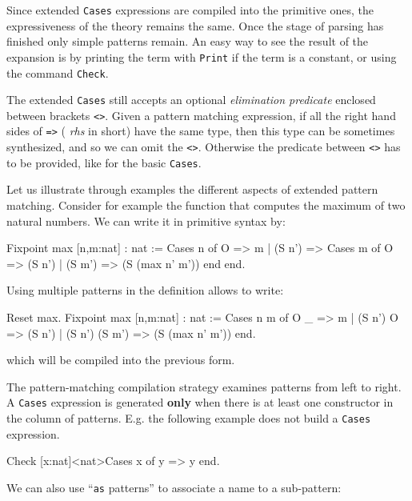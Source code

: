 Since extended {\tt Cases} expressions are compiled into the primitive
ones, the expressiveness of the theory remains the same. Once the
stage of parsing has finished only simple patterns remain. An easy way
to see the result of the expansion is by printing the term with
\texttt{Print} if the term is a constant, or using the command
\texttt{Check}.

The extended \texttt{Cases} still accepts an optional {\em elimination
predicate} enclosed between brackets \texttt{<>}.  Given a pattern
matching expression, if all the right hand sides of \texttt{=>} ({\em
rhs} in short) have the same type, then this type can be sometimes
synthesized, and so we can omit the \texttt{<>}. Otherwise 
the predicate between \texttt{<>} has to be provided, like for the basic
\texttt{Cases}.

Let us illustrate through examples the different aspects of extended
pattern matching. Consider for example the function that computes the
maximum of two natural numbers. We can write it in primitive syntax
by:

\begin{coq_example}
Fixpoint max [n,m:nat] : nat :=
   Cases n of
      O     => m
   | (S n') => Cases m of
                  O     => (S n')
               | (S m') => (S (max n' m'))
               end
   end.
\end{coq_example}

Using multiple patterns in the definition allows to write:

\begin{coq_example}
Reset max.
Fixpoint max [n,m:nat] : nat :=
   Cases n m of
      O         _  => m   
   | (S n') O      => (S n')
   | (S n') (S m') => (S (max n' m')) 
   end.
\end{coq_example}

which will be compiled into the previous form.

The pattern-matching compilation strategy examines patterns from left
to right. A \texttt{Cases} expression is generated {\bf only} when
there is at least one constructor in the column of patterns. E.g. the
following example does not build a \texttt{Cases} expression.

\begin{coq_example}
Check [x:nat]<nat>Cases x of y => y end.
\end{coq_example}

We can also use ``\texttt{as} patterns'' to associate a name to a
sub-pattern:

